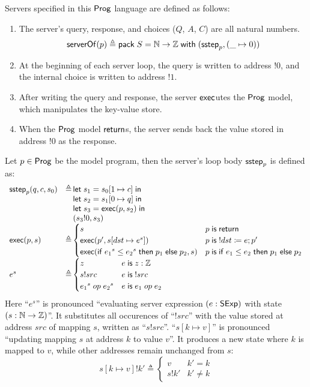 Servers specified in this $\mathsf{Prog}$ language are defined as follows:
\begin{enumerate}
\item The server's query, response, and choices ($Q$, $A$, $C$) are all
  natural numbers.
  \[\mathsf{serverOf}(p)\triangleq\mathsf{pack}\;S=\mathbb N\to\mathbb Z\;\mathsf{with}\;(\mathsf{sstep}_p,(\_\mapsto0))\]
\item At the beginning of each server loop, the query is written to address
  $!0$, and the internal choice is written to address $!1$.
\item After writing the query and response, the server $\mathsf{exec}$utes the $\mathsf{Prog}$
  model, which manipulates the key-value store.
\item When the $\mathsf{Prog}$ model $\mathsf{return}$s, the server sends back the value stored
  in address $!0$ as the response.
\end{enumerate}
Let $p\in\mathsf{Prog}$ be the model program, then the server's loop body $\mathsf{sstep}_p$ is
defined as:
\[\begin{array}{lr@{\,}l}
\sstep_p(q,c,s_0)&\triangleq&\letin{s_1}{\update{s_0}{1}{c}}\\
&&\letin{s_2}{\update{s_1}{0}{q}}\\
&&\letin{s_3}{\Exec(p,s_2)}\\
&&(s_3!0,s_3)\\
\Exec(p,s)&\triangleq&
\begin{cases}
  s&p\Is\Return\\
  \Exec(p',\update{s}{dst}{e^s})&p\Is !dst\coloneqq e;p'\\
  \Exec(\If {e_1}^s\le{e_2}^s\Then p_1\Else p_2,s)&p\Is\If e_1\le e_2\Then p_1\Else p_2
\end{cases}\\
e^s&\triangleq&
\begin{cases}
  z&e\Is z:\Int\\
  s!src&e\Is !src\\
  {e_1}^s\oop{e_2}^s&e\Is e_1\oop e_2
\end{cases}
\end{array}\]
Here ``$e^s$'' is pronounced ``evaluating server expression $(e:\mathsf{SExp})$ with
state $(s:\mathbb N\to\mathbb Z)$''.  It substitutes all occurences of ``$!src$'' with the
value stored at address $src$ of mapping $s$, written as ``$s!src$''.
``$s[k\mapsto v]$'' is pronounced ``updating mapping $s$ at address $k$ to value
$v$''.  It produces a new state where $k$ is mapped to $v$, while other
addresses remain unchanged from $s$:
\[s[k\mapsto v]!k'\triangleq\begin{cases}v&k'=k\\
s!k'&k'\neq k\end{cases}\]

